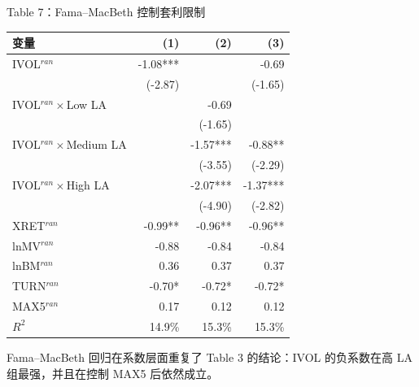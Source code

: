 \documentclass[aspectratio=169,10pt]{beamer}
\newcommand{\tinytab}{\tiny\setlength{\tabcolsep}{2.2pt}\renewcommand{\arraystretch}{1.08}}
\begin{document}
\begin{frame}{Table 7：Fama--MacBeth 控制套利限制}
	\tinytab
	\begin{tabular}{lrrr}
		\toprule
		变量 & (1) & (2) & (3)\\
		\midrule
		IVOL$^{ran}$ & -1.08*** & & -0.69\\
		& (-2.87) & & (-1.65)\\
		IVOL$^{ran}\times$Low LA & & -0.69 & \\
		& & (-1.65) & \\
		IVOL$^{ran}\times$Medium LA & & -1.57*** & -0.88**\\
		& & (-3.55) & (-2.29)\\
		IVOL$^{ran}\times$High LA & & -2.07*** & -1.37***\\
		& & (-4.90) & (-2.82)\\
		XRET$^{ran}$ & -0.99** & -0.96** & -0.96**\\
		lnMV$^{ran}$ & -0.88 & -0.84 & -0.84\\
		lnBM$^{ran}$ & 0.36 & 0.37 & 0.37\\
		TURN$^{ran}$ & -0.70* & -0.72* & -0.72*\\
		MAX5$^{ran}$ & 0.17 & 0.12 & 0.12\\
		$R^2$ & 14.9\% & 15.3\% & 15.3\%\\
		\bottomrule
	\end{tabular}
	\par\vspace{4pt}
	\small Fama--MacBeth 回归在系数层面重复了 Table 3 的结论：IVOL 的负系数在高 LA 组最强，并且在控制 MAX5 后依然成立。
\end{frame}
\end{document}
